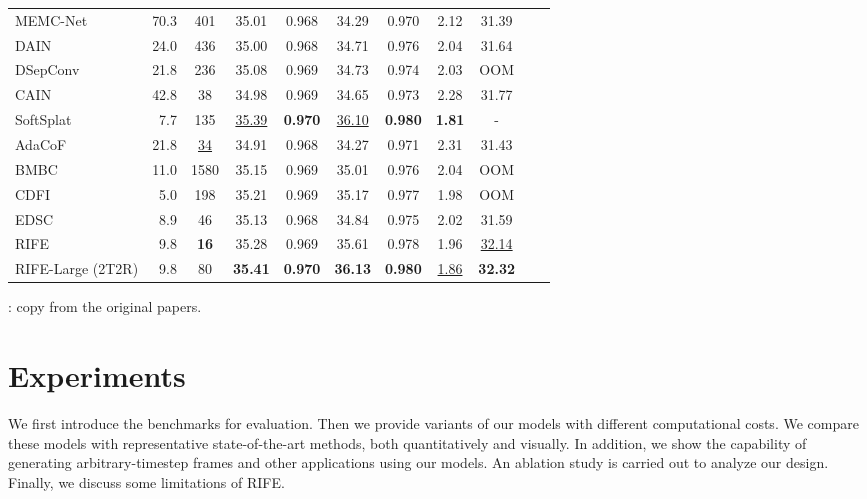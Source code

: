 \documentclass[final]{cvpr}
\def\red#1{\textcolor{MyRed}{#1}}
\def\blue#1{\textcolor{MyBlue}{#1}}
\def\first#1{\red{\textbf{#1}}}
\def\second#1{\blue{\underline{#1}}}
\begin{document}
\begin{table*}
\begin{tabular}{lcccccccccc}
\rowcolor{mygray} MEMC-Net~\cite{bao2019memc} & 70.3 & 401 & {35.01} & {0.968} &{34.29}& {0.970}  &{2.12} & 31.39  \\ 

		 \rowcolor{mygray}DAIN~\cite{bao2019depth} & 24.0 & 436 & {35.00} & {0.968} &{34.71}& {0.976}  &2.04 & 31.64\\ 

		DSepConv~\cite{cheng2020video} & 21.8 & 236 & 35.08 & 0.969 & 34.73 & 0.974 & 2.03 & OOM\\
		
		CAIN~\cite{choi2020channel} & 42.8 & 38 & 34.98 & {0.969} & 34.65 & 0.973 & 2.28 & 31.77\\
		
		\rowcolor{mygray} SoftSplat~\cite{niklaus2020softmax} & ~7.7 & 135 & \second{35.39} & \first{0.970} & \second{36.10} & \first{0.980} & \first{1.81} & - \\
		
		AdaCoF~\cite{lee2020adacof} & 21.8 & \second{34} & 34.91 & 0.968 & 34.27 & 0.971 & 2.31 & 31.43 \\ 
		
		BMBC~\cite{park2020bmbc} & 11.0 & 1580 & 35.15 & {0.969} & 35.01 & 0.976 & 2.04 & OOM\\
		
		CDFI~\cite{ding2021cdfi} & ~5.0 & 198 & 35.21 & 0.969 &35.17 & 0.977 & 1.98 & OOM\\
		EDSC~\cite{cheng2020multiple} & {~8.9} & 46 & 35.13 & 0.968 & 34.84 & 0.975 & 2.02 & 31.59
		
		\\\hline \hline
		
		RIFE & {~9.8} & \first{16} & 35.28 & {0.969} & 35.61 & {0.978} & 1.96 & \second{32.14}\\
		
		RIFE-Large (2T2R) & {~9.8} & 80 & \first{35.41} & \first{0.970} & \first{36.13} & \first{0.980} & \second{1.86} & \first{32.32}
		\\
		\bottomrule
	\end{tabular} 
	\label{tab:comparison}
	\begin{tablenotes}
		\raggedleft
		\item{
   
: copy from the original papers.
    
	}
	\end{tablenotes}
	\label{tab:UCF101_Vimeo90K_MB}
	\vspace{-1em}
\end{table*} \section{Experiments}
We first introduce the benchmarks for evaluation. Then we provide variants of our models with different computational costs. We compare these models with representative state-of-the-art methods, both quantitatively and visually. In addition, we show the capability of generating arbitrary-timestep frames and other applications using our models. An ablation study is carried out to analyze our design. Finally, we discuss some limitations of RIFE.
\end{document}
